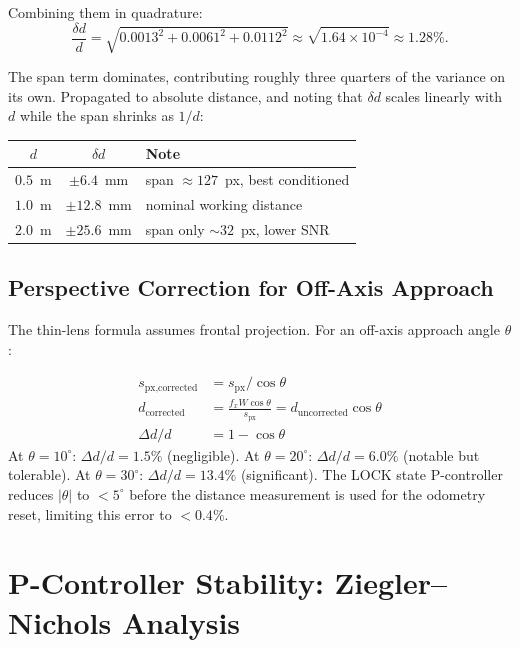 \noindent Combining them in quadrature:
\begin{equation}
\frac{\delta d}{d}
  = \sqrt{0.0013^2 + 0.0061^2 + 0.0112^2}
  \approx \sqrt{1.64\times10^{-4}}
  \approx 1.28\%.
\label{eq:distuncertainty}
\end{equation}

\noindent The span term dominates, contributing roughly three quarters of the
variance on its own. Propagated to absolute distance, and noting that
$\delta d$ scales linearly with $d$ while the span shrinks as $1/d$:
\begin{center}
\small
\begin{tabular}{@{}ccl@{}}
\toprule
$d$ & $\delta d$ & Note \\
\midrule
$0.5$~m & $\pm6.4$~mm & span $\approx127$~px, best conditioned \\
$1.0$~m & $\pm12.8$~mm & nominal working distance \\
$2.0$~m & $\pm25.6$~mm & span only $\sim32$~px, lower SNR \\
\bottomrule
\end{tabular}
\end{center}

\subsection{Perspective Correction for Off-Axis Approach}

The thin-lens formula assumes frontal projection. For an off-axis approach angle $\theta$:

\begin{eqblock}
\begin{align}
s_{\text{px,corrected}} &= s_{\text{px}}/\cos\theta \\
d_{\text{corrected}} &= \frac{f_x W \cos\theta}{s_{\text{px}}} = d_{\text{uncorrected}}\cos\theta \\
\Delta d/d &= 1-\cos\theta
\end{align}
At $\theta=10^\circ$: $\Delta d/d = 1.5\%$ (negligible). At $\theta=20^\circ$: $\Delta d/d = 6.0\%$ (notable but tolerable). At $\theta=30^\circ$: $\Delta d/d = 13.4\%$ (significant). The LOCK state P-controller reduces $|\theta|$ to $<5^\circ$ before the distance measurement is used for the odometry reset, limiting this error to $<0.4\%$.
\end{eqblock}

\section{P-Controller Stability: Ziegler--Nichols Analysis}

